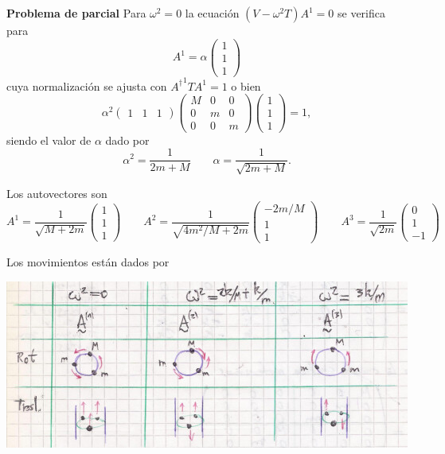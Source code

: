 \documentclass[10pt,oneside]{CBFT_book}
\begin{document}
\begin{ejemplo}{\bf Problema de parcial}
Para $\omega^2 = 0$ la ecuación $ (V - \omega^2 T )A^1 = 0 $ se verifica para 
\[
	A^1 = \alpha \begin{pmatrix} 1 \\ 1 \\ 1 \end{pmatrix}
\]
cuya normalización se ajusta con $ {A^\dagger}^1 T A^1 = 1$ o bien 
\[
	\alpha^2 \begin{pmatrix} 1 & 1 & 1 \end{pmatrix}
	\begin{pmatrix}
	 M & 0 & 0 \\
	 0 & m & 0 \\
	 0 & 0 & m
	\end{pmatrix}
	\begin{pmatrix} 1 \\ 1 \\ 1 \end{pmatrix} = 1,
\]
siendo el valor de $\alpha$ dado por 
\[
	\alpha^2 = \frac{1}{2m+M} \qquad \alpha = \frac{1}{ \sqrt{2m+M} }.
\]

Los autovectores son 
\[
	A^1 = \frac{1}{\sqrt{M + 2m}} \begin{pmatrix} 1 \\ 1 \\ 1 \end{pmatrix} \qquad 
	A^2 = \frac{1}{\sqrt{4m^2/M + 2m}} \begin{pmatrix} -2m/M \\ 1 \\ 1 \end{pmatrix} \qquad 
	A^3 = \frac{1}{\sqrt{ 2m }} \begin{pmatrix} 0 \\ 1 \\ -1 \end{pmatrix} \qquad 
\]
 
Los movimientos están dados por

\includegraphics[scale=0.5]{images/fig_mc_problema_parcial_osc_4.jpg}
 

\end{ejemplo}
\end{document}
